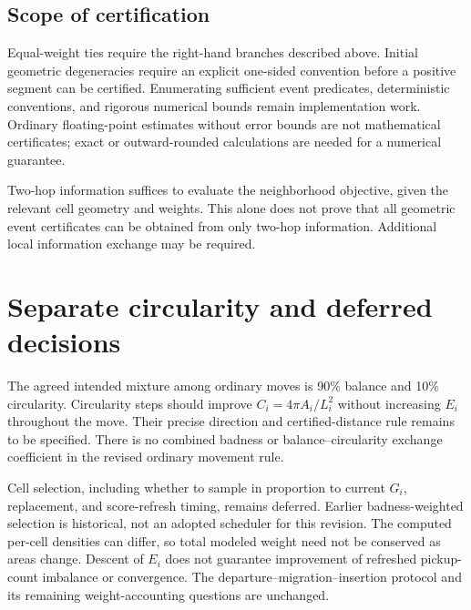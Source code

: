 \documentclass[11pt]{article}
\begin{document}
\subsection{Scope of certification}
Equal-weight ties require the right-hand branches described above.
Initial geometric degeneracies require an explicit one-sided convention
before a positive segment can be certified. Enumerating sufficient event
predicates, deterministic conventions, and rigorous numerical bounds
remain implementation work. Ordinary floating-point estimates without
error bounds are not mathematical certificates; exact or outward-rounded
calculations are needed for a numerical guarantee.

Two-hop information suffices to evaluate the neighborhood objective,
given the relevant cell geometry and weights. This alone does not prove
that all geometric event certificates can be obtained from only two-hop
information. Additional local information exchange may be required.

\section{Separate circularity and deferred decisions}
The agreed intended mixture among ordinary moves is 90\% balance and
10\% circularity. Circularity steps should improve
$C_i=4\pi A_i/L_i^2$ without increasing $E_i$ throughout the move.
Their precise direction and certified-distance rule remains to be
specified. There is no combined badness or balance--circularity exchange
coefficient in the revised ordinary movement rule.

Cell selection, including whether to sample in proportion to current
$G_i$, replacement, and score-refresh timing, remains deferred. Earlier
badness-weighted selection is historical, not an adopted scheduler for
this revision. The computed per-cell densities can differ, so total
modeled weight need not be conserved as areas change. Descent of $E_i$
does not guarantee improvement of refreshed pickup-count imbalance or
convergence. The departure--migration--insertion protocol and its
remaining weight-accounting questions are unchanged.
\end{document}
